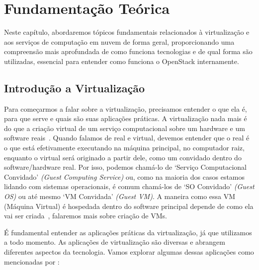 \chapter{Fundamentação Teórica}

Neste capítulo, abordaremos tópicos fundamentais relacionados à virtualização e aos serviços de computação em nuvem de forma geral, proporcionando uma compreensão mais aprofundada de como funciona tecnologias e de qual forma são utilizadas, essencial para entender como funciona o OpenStack internamente.


\section{Introdução a Virtualização}

Para começarmos a falar sobre a virtualização, precisamos entender o que ela é, para que serve e quais são suas aplicações práticas. A virtualização nada mais é do que a criação virtual de um serviço computacional sobre um hardware e um software reais~\citep{chirammal2016mastering}. Quando falamos de real e virtual, devemos entender que o real é o que está efetivamente executando na máquina principal, no computador raiz, enquanto o virtual será originado a partir dele, como um convidado dentro do software/hardware real. Por isso, podemos chamá-lo de `Serviço Computacional Convidado' \textit{(Guest Computing Service)} ou, como na maioria dos casos estamos lidando com sistemas operacionais, é comum chamá-los de `SO Convidado' \textit{(Guest OS)} ou até mesmo `VM Convidada' \textit{(Guest VM)}. A maneira como essa VM (Máquina Virtual) é hospedada dentro do software principal depende de como ela vai ser criada~\citep{chirammal2016mastering}, falaremos mais sobre criação de VMs.

 É fundamental entender as aplicações práticas da virtualização, já que utilizamos a todo momento. As aplicações de virtualização são diversas e abrangem diferentes aspectos da tecnologia. Vamos explorar algumas dessas aplicações como mencionadas por \cite{chirammal2016mastering}:

